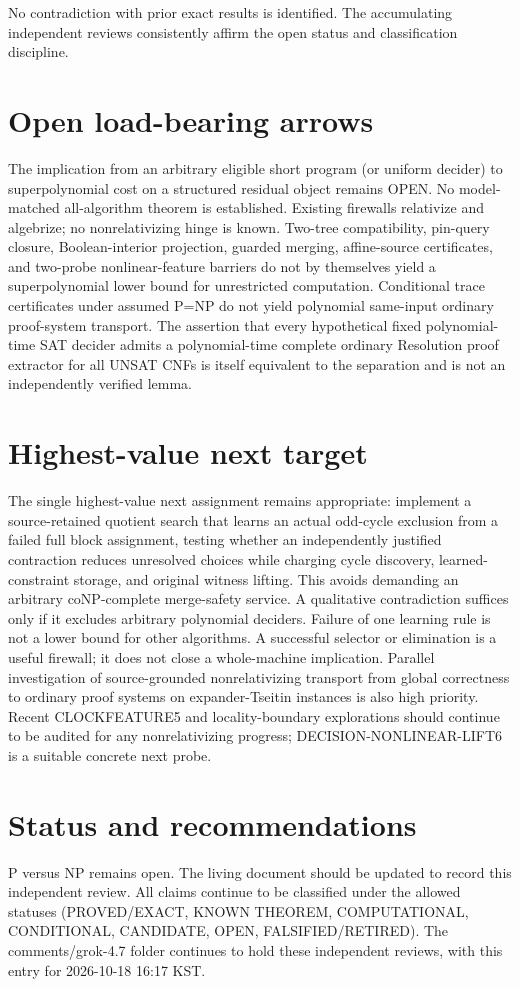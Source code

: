 \documentclass[11pt]{article}
\begin{document}
No contradiction with prior exact results is identified. The accumulating independent reviews consistently affirm the open status and classification discipline.

\section{Open load-bearing arrows}
The implication from an arbitrary eligible short program (or uniform decider) to superpolynomial cost on a structured residual object remains OPEN. No model-matched all-algorithm theorem is established. Existing firewalls relativize and algebrize; no nonrelativizing hinge is known. Two-tree compatibility, pin-query closure, Boolean-interior projection, guarded merging, affine-source certificates, and two-probe nonlinear-feature barriers do not by themselves yield a superpolynomial lower bound for unrestricted computation. Conditional trace certificates under assumed P=NP do not yield polynomial same-input ordinary proof-system transport. The assertion that every hypothetical fixed polynomial-time SAT decider admits a polynomial-time complete ordinary Resolution proof extractor for all UNSAT CNFs is itself equivalent to the separation and is not an independently verified lemma.

\section{Highest-value next target}
The single highest-value next assignment remains appropriate: implement a source-retained quotient search that learns an actual odd-cycle exclusion from a failed full block assignment, testing whether an independently justified contraction reduces unresolved choices while charging cycle discovery, learned-constraint storage, and original witness lifting. This avoids demanding an arbitrary coNP-complete merge-safety service. A qualitative contradiction suffices only if it excludes arbitrary polynomial deciders. Failure of one learning rule is not a lower bound for other algorithms. A successful selector or elimination is a useful firewall; it does not close a whole-machine implication. Parallel investigation of source-grounded nonrelativizing transport from global correctness to ordinary proof systems on expander-Tseitin instances is also high priority. Recent CLOCKFEATURE5 and locality-boundary explorations should continue to be audited for any nonrelativizing progress; DECISION-NONLINEAR-LIFT6 is a suitable concrete next probe.

\section{Status and recommendations}
P versus NP remains open. The living document should be updated to record this independent review. All claims continue to be classified under the allowed statuses (PROVED/EXACT, KNOWN THEOREM, COMPUTATIONAL, CONDITIONAL, CANDIDATE, OPEN, FALSIFIED/RETIRED). The comments/grok-4.7 folder continues to hold these independent reviews, with this entry for 2026-10-18 16:17 KST.

\end{document}
